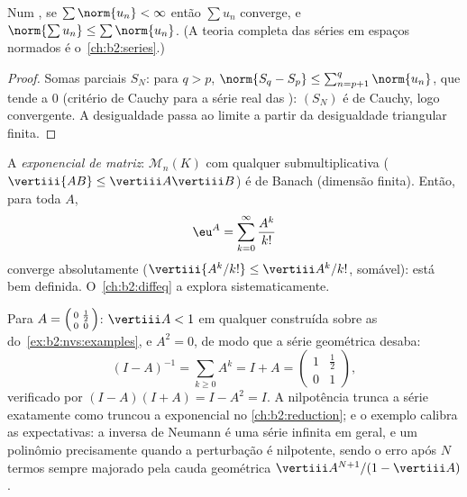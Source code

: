 \begin{theorem}\label{thm:b2:nvs:absoluteconvergence}
Num , se $\sum \norm{u_n} < \infty$ então $\sum u_n$
converge, e $\norm{\sum u_n} \leq \sum\norm{u_n}$. (A teoria completa
das séries em espaços normados é o~\cref{ch:b2:series}.)
\end{theorem}

\begin{proof}
Somas parciais $S_N$: para $q > p$, $\norm{S_q - S_p} \leq
\sum_{n=p+1}^{q}\norm{u_n}$, que tende a $0$ (critério de Cauchy
para a série real das ): $(S_N)$ é de Cauchy, logo convergente.
A desigualdade passa ao limite a partir da desigualdade triangular
finita.
\end{proof}

\begin{example}\label{ex:b2:nvs:matrixexp}
A \emph{exponencial de matriz}:
$\mathcal{M}_n(K)$ com qualquer  submultiplicativa ($\vertiii{AB}
\leq \vertiii A \vertiii B$) é de Banach (dimensão finita). Então, para
toda $A$,
\[
\eu^A = \sum_{k=0}^{\infty} \frac{A^k}{k!}
\]
converge absolutamente ($\vertiii{A^k/k!} \leq \vertiii A^k /k!$,
somável): está bem definida. O~\cref{ch:b2:diffeq} a explora
sistematicamente.
\end{example}

\begin{example}\label{ex:b2:nvs:neumannfinite}
Para $A = \begin{psmallmatrix}0 & \frac12\\ 0 &
0\end{psmallmatrix}$: $\vertiii A < 1$ em qualquer 
construída sobre as  do~\cref{ex:b2:nvs:examples}, e $A^2 = 0$, de modo que
a série geométrica desaba:
\[
(I - A)^{-1} = \sum_{k \geq 0} A^k = I + A =
\begin{pmatrix}1 & \tfrac12\\ 0 & 1\end{pmatrix},
\]
verificado por $(I - A)(I + A) = I - A^2 = I$. A nilpotência
trunca a série exatamente como truncou a exponencial no
\cref{ch:b2:reduction}; e o exemplo calibra as
expectativas: a inversa de Neumann é uma série infinita em
geral, e um polinômio precisamente quando a perturbação é
nilpotente, sendo o erro após $N$ termos sempre majorado pela
cauda geométrica $\vertiii A^{N+1}/(1 - \vertiii A)$.
\end{example}


